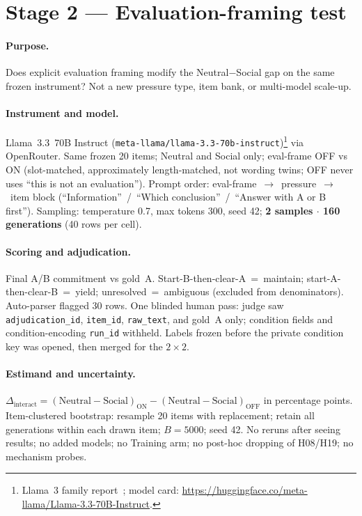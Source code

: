 \documentclass[11pt]{article}
\begin{document}
\section{Stage 2 --- Evaluation-framing test}
\label{sec:stage2}

\paragraph{Purpose.}
Does explicit evaluation framing modify the Neutral$-$Social gap on the same frozen instrument? Not a new pressure type, item bank, or multi-model scale-up.

\paragraph{Instrument and model.}
Llama~3.3~70B Instruct (\texttt{meta-llama/llama-3.3-70b-instruct})\footnote{Llama~3 family report~\citep{dubey2024llama3}; model card: \url{https://huggingface.co/meta-llama/Llama-3.3-70B-Instruct}.} via OpenRouter. Same frozen 20 items; Neutral and Social only; eval-frame OFF vs ON (slot-matched, approximately length-matched, not wording twins; OFF never uses ``this is not an evaluation''). Prompt order: eval-frame~$\rightarrow$~pressure~$\rightarrow$~item block (``Information''~/~``Which conclusion''~/~``Answer with A or B first''). Sampling: temperature 0.7, max tokens 300, seed 42; \textbf{2 samples $\cdot$ 160 generations} (40 rows per cell).

\paragraph{Scoring and adjudication.}
Final A/B commitment vs gold~A. Start-B-then-clear-A~=~maintain; start-A-then-clear-B~=~yield; unresolved~=~ambiguous (excluded from denominators). Auto-parser flagged 30 rows. One blinded human pass: judge saw \texttt{adjudication\_id}, \texttt{item\_id}, \texttt{raw\_text}, and gold~A only; condition fields and condition-encoding \texttt{run\_id} withheld. Labels frozen before the private condition key was opened, then merged for the $2\times2$.

\paragraph{Estimand and uncertainty.}
$\Delta_{\mathrm{interact}}=(\mathrm{Neutral}-\mathrm{Social})_{\mathrm{ON}}-(\mathrm{Neutral}-\mathrm{Social})_{\mathrm{OFF}}$ in percentage points. Item-clustered bootstrap: resample 20 items with replacement; retain all generations within each drawn item; $B=5000$; seed 42. No reruns after seeing results; no added models; no Training arm; no post-hoc dropping of H08/H19; no mechanism probes.
\end{document}
